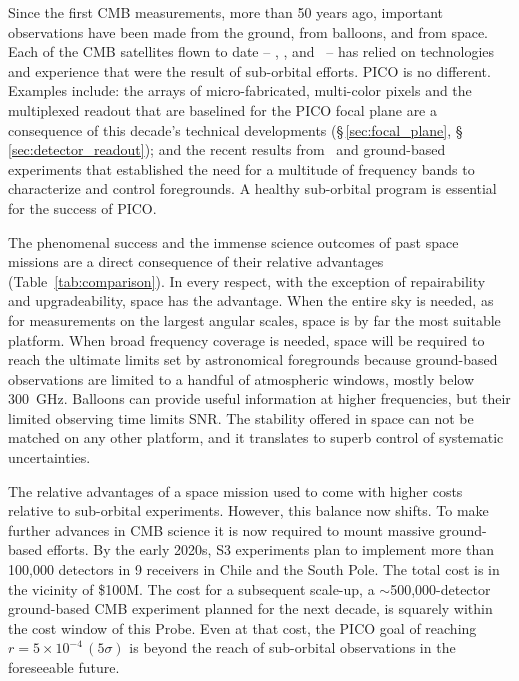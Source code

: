 \documentclass[PICOReport.tex]{subfiles}
\begin{document}
Since the first \ac{CMB} measurements, more than 50 years ago, important observations have been made from the ground, from balloons, and from space. Each of the CMB satellites flown to date -- \cobe, \wmap, and \planck\ -- has relied on technologies and experience that were the result of sub-orbital efforts. PICO is no different. Examples include: the arrays of micro-fabricated, multi-color pixels and the multiplexed readout that are baselined for the PICO focal plane are a consequence of this decade's technical developments (\S\,\ref{sec:focal_plane}, \S\,\ref{sec:detector_readout}); and the recent results from \planck \ and ground-based experiments that established the need for a multitude of frequency bands to characterize and control foregrounds.  A healthy sub-orbital program is essential for the success of PICO. 


The phenomenal success and the immense science outcomes of past space missions are a direct consequence of their relative advantages (Table~\ref{tab:comparison}). In every respect, with the exception of repairability and upgradeability, space has the advantage. When the entire sky is needed, as for measurements on the largest angular scales, space is by far the most suitable platform.  When broad frequency coverage is needed, space will be required to reach the ultimate limits set by astronomical foregrounds because ground-based observations are limited to a handful of atmospheric windows, mostly below 300~GHz. Balloons can provide useful information at higher frequencies, but their limited observing time limits \ac{SNR}. The stability offered in space can not be matched on any other platform, and it translates to superb control of systematic uncertainties. %

The relative advantages of a space mission used to come with higher costs relative to sub-orbital experiments. However, this balance now shifts. To make further advances in CMB science it is now required to mount massive ground-based efforts.  By the early 2020s, S3 experiments plan to implement more than 100,000 detectors in 9 receivers in Chile and the South Pole. The total cost is in the vicinity of \$100M. The cost for a subsequent scale-up, a $\sim$500,000-detector ground-based CMB experiment planned for the next decade, is squarely within the cost window of this Probe. Even at that cost, the PICO goal of reaching $r = 5 \times 10^{-4}\,(5 \sigma) $ is beyond the reach of sub-orbital observations in the foreseeable future.  
\end{document}
